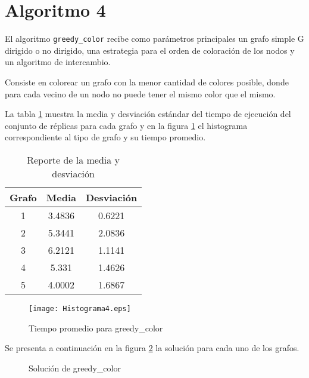 \documentclass{article}
\begin{document}
\newpage
\section*{Algoritmo 4}
El algoritmo \texttt{greedy\_color} recibe como parámetros principales un grafo simple G dirigido o no dirigido, una estrategia para el orden de coloración de los nodos y un algoritmo de intercambio.

Consiste en colorear un grafo con la menor cantidad de colores posible, donde para cada vecino de un nodo no puede tener el mismo color que el mismo. 

La tabla \ref{Tabla4} muestra la media y desviación estándar del tiempo de ejecución del conjunto de réplicas para cada grafo y en la figura \ref{Figura4} el histograma correspondiente al tipo de grafo y su tiempo promedio.

\begin{table}[h]
\centering
\begin{tabular}{|c|c|c|}
\hline
\textbf{Grafo} & \textbf{Media} & \textbf{Desviación} \\ \hline
1              & 3.4836         & 0.6221              \\ \hline
2              & 5.3441         & 2.0836              \\ \hline
3              & 6.2121         & 1.1141              \\ \hline
4              & 5.331          & 1.4626              \\ \hline
5              & 4.0002         & 1.6867              \\ \hline
\end{tabular}
\caption{Reporte de la media y desviación} 
\label{Tabla4}
\end{table}

\begin{figure}[h]
\centering
\texttt{[image: Histograma4.eps]}  
\caption{Tiempo promedio para greedy\_color}
\label{Figura4}
\end{figure}

Se presenta a continuación en la figura \ref{Grafos4} la solución para cada uno de los grafos. 



\begin{figure}[H]
\centering
{}\hspace{5mm}
\vspace{5mm}
\hspace{5mm}
\vspace{5mm}
\caption{Solución de greedy\_color} \label{Grafos4}
\end{figure}
\end{document}
